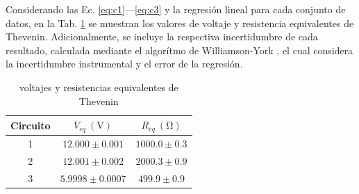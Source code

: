 Considerando las Ec. \ref{eq:c1}---\ref{eq:c3} y la regresión lineal para cada
conjunto de datos, en la Tab. \ref{tab:tevenin} se muestran los valores de
voltaje y resistencia equivalentes de Thevenin. Adicionalmente, se incluye la
respectiva incertidumbre de cada resultado, calculada mediante el algorítmo de
Williamson-York \cite{cantrell2008technical}, el cual considera la incertidumbre
instrumental y el error de la regresión.
\begin{table}[H]
  \centering
  \caption{voltajes y resistencias equivalentes de Thevenin}
  \begin{tabular}{c|c|c}
    Circuito & $V_{eq}\ (\unit{\volt})$ & $R_{eq}\ (\unit{\ohm})$ \\
    \hline
    1 & $12.000\pm0.001$ & $1000.0\pm0.3$ \\
    2 & $12.001\pm0.002$ & $2000.3\pm0.9$ \\
    3 & $5.9998\pm0.0007$ & $499.9\pm0.9$
  \end{tabular}
  \label{tab:tevenin}
\end{table}
